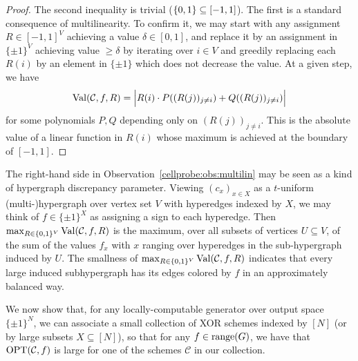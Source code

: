 \begin{proof}
The second inequality is trivial ($\{0,1\} \subseteq [-1,1]$). The first is a standard consequence of multilinearity. To confirm it, we may start with any assignment $R \in [-1,1]^V$ achieving a value $\delta \in [0,1]$, and replace it by an assignment in $\{\pm 1\}^V$ achieving value $\geq \delta$ by iterating over $i\in V$ and greedily replacing each $R(i)$ by an element in $\{\pm 1\}$ which does not decrease the value. At a given step, we have 
\[
\mathrm{Val}(\mathcal{C},f,R)= \Bigl|R(i) \cdot P((R(j))_{j \neq i}) +  Q((R(j))_{j \neq i})\Bigr|
\]
for some polynomials $P,Q$ depending only on $(R(j))_{j \neq i}$. This is the absolute value of a linear function in $R(i)$ whose maximum is achieved at the boundary of $[-1,1]$.
\end{proof}
The right-hand side in Observation~\ref{cellprobe:obs:multilin} may be seen as a kind of hypergraph discrepancy parameter. Viewing $(c_x)_{x \in X}$ as a $t$-uniform (multi-)hypergraph over vertex set $V$ with hyperedges indexed by $X$, we may think of $f \in \{ \pm 1\}^X$ as assigning a sign to each hyperedge. Then $ \max_{R\in \{0,1\}^V} \mathrm{Val} (\mathcal{C},f,R) $ is the maximum, over all subsets of vertices $U \subseteq V$, of the sum of the values $f_x$ with $x$ ranging over hyperedges in the sub-hypergraph induced by $U$. The smallness of $ \max_{R\in \{0,1\}^V} \mathrm{Val} (\mathcal{C},f,R) $ indicates that every large induced subhypergraph has its edges colored by $f$ in an approximately balanced way.

We now show that, for any locally-computable generator over output space $\{\pm 1\}^N$, we can associate a small collection of XOR schemes indexed by $[N]$ (or by large subsets $X\subseteq [N]$), so that for any $f \in \mathrm{range}(G)$, we have that $\mathrm{OPT}(\mathcal{C},f)$ is large for one of the schemes $\mathcal{C}$ in our collection. 

